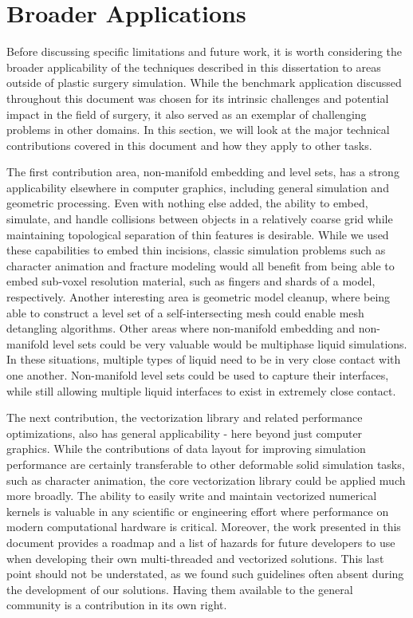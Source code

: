 \section{Broader Applications}

Before discussing specific limitations and future work, it is worth
considering the broader applicability of the techniques described in
this dissertation to areas outside of plastic surgery
simulation. While the benchmark application discussed throughout this
document was chosen for its intrinsic challenges and potential impact
in the field of surgery, it also served as an exemplar of challenging
problems in other domains. In this section, we will look at the major
technical contributions covered in this document and how they apply to
other tasks.

The first contribution area, non-manifold embedding and level sets,
has a strong applicability elsewhere in computer graphics, including
general simulation and geometric processing. Even with nothing else
added, the ability to embed, simulate, and handle collisions between
objects in a relatively coarse grid while maintaining topological
separation of thin features is desirable. While we used these
capabilities to embed thin incisions, classic simulation problems such
as character animation and fracture modeling would all benefit from
being able to embed sub-voxel resolution material, such as fingers and
shards of a model, respectively. Another interesting area is geometric
model cleanup, where being able to construct a level set of a
self-intersecting mesh could enable mesh detangling algorithms. Other
areas where non-manifold embedding and non-manifold level sets could
be very valuable would be multiphase liquid simulations. In these
situations, multiple types of liquid need to be in very close contact
with one another. Non-manifold level sets could be used to capture
their interfaces, while still allowing multiple liquid interfaces to
exist in extremely close contact.

The next contribution, the vectorization library and related
performance optimizations, also has general applicability - here
beyond just computer graphics. While the contributions of data layout
for improving simulation performance are certainly transferable to
other deformable solid simulation tasks, such as character animation,
the core vectorization library could be applied much more broadly. The
ability to easily write and maintain vectorized numerical kernels is
valuable in any scientific or engineering effort where performance on
modern computational hardware is critical. Moreover, the work
presented in this document provides a roadmap and a list of hazards
for future developers to use when developing their own multi-threaded
and vectorized solutions. This last point should not be understated,
as we found such guidelines often absent during the development of
our solutions. Having them available to the general community is a
contribution in its own right.


